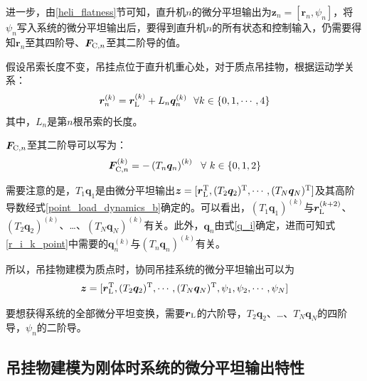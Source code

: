 进一步，由\ref{heli_flatness}节可知，直升机$n$的微分平坦输出为${\boldsymbol{z}_n} = [\boldsymbol{r}_n, \psi_n]$，将$\psi_n$写入系统的微分平坦输出后，要得到直升机$n$的所有状态和控制输入，仍需要得知$\boldsymbol{r}_n$至其四阶导、$\boldsymbol{F}_{{\rm{C}},n}$至其二阶导的值。

假设吊索长度不变，吊挂点位于直升机重心处，对于质点吊挂物，根据运动学关系：
\begin{equation}\label{r_i_k_point}
    \boldsymbol{r}_n^{(k)} = \boldsymbol{r}^{(k)}_{\rm{L}} + L_n \boldsymbol{q}_n^{(k)} \,\,\,\, \forall k \in \left\{ {0,1,\cdots,4} \right\}
\end{equation}
其中，$L_n$是第$n$根吊索的长度。

$\boldsymbol{F}_{{\rm{C}},n}$至其二阶导可以写为：
\begin{equation}
    \boldsymbol{F}_{{\rm{C}},n}^{(k)} = -\left(T_n \boldsymbol{q}_n\right)^{(k)} \,\,\,\, \forall \,\, k \in \left\{0, 1, 2\right\}
\end{equation}

需要注意的是，$T_1\boldsymbol{q}_1$是由微分平坦输出$\boldsymbol{z} = [\boldsymbol{r}{\rm{_L^T}}, (T_2\boldsymbol{q}_2){\rm{^T}}, \cdots, (T_N\boldsymbol{q}_N){\rm{^T}}]$及其高阶导数经式\ref{point_load_dynamics_b}确定的。可以看出，$\left(T_1\boldsymbol{q}_1\right)^{(k)}$与$\boldsymbol{r}_{\rm{L}}^{(k+2)}$、$\left(T_2\boldsymbol{q}_2\right)^{(k)}$、\ldots、$\left(T_N\boldsymbol{q}_N\right)^{(k)}$有关。此外，$\boldsymbol{q}_n$由式\ref{q_i}确定，进而可知式\ref{r_i_k_point}中需要的$\boldsymbol{q}_n^{(k)}$与$(T_n\boldsymbol{q}_n)^{(k)}$有关。

所以，吊挂物建模为质点时，协同吊挂系统的微分平坦输出可以为
\begin{equation}
    \boldsymbol{z} = [\boldsymbol{r}{\rm{_L^T}}, (T_2\boldsymbol{q}_2){\rm{^T}}, \cdots, (T_N\boldsymbol{q}_N){\rm{^T}}, \psi_1, \psi_2, \cdots, \psi_N]
\end{equation}

要想获得系统的全部微分平坦变换，需要$\boldsymbol{r}{\rm{_L}}$的六阶导，$T_2\boldsymbol{q}_2$、\ldots、$T_N\boldsymbol{q}_N$的四阶导，$\psi_n$的二阶导。

\subsection{吊挂物建模为刚体时系统的微分平坦输出特性}\label{rigid_load_flatness}

